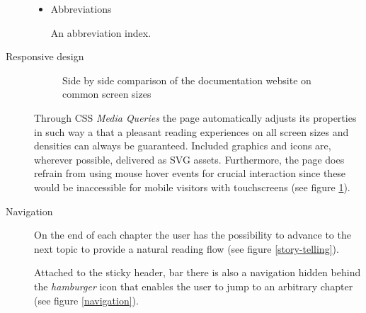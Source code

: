 \begin{description}
\begin{itemize}
		\item Abbreviations

		An abbreviation index.

	\end{itemize}

	\item[Responsive design]\hfill

	\begin{figure}[]
		\caption{Side by side comparison of the documentation website on common screen sizes}
		\label{responsive-design}
	\end{figure}

	Through \ac{CSS} \textit{Media Queries} the page automatically adjusts its properties in such way a that a pleasant reading experiences on all screen sizes and densities can always be guaranteed. Included graphics and icons are, wherever possible, delivered as \ac{SVG} assets. Furthermore, the page does refrain from using mouse hover events for crucial interaction since these would be inaccessible for mobile visitors with touchscreens (see figure \ref{responsive-design}).

	\item[Navigation]\hfill

	On the end of each chapter the user has the possibility to advance to the next topic to provide a natural reading flow (see figure \ref{story-telling}).

	Attached to the sticky header, bar there is also a navigation hidden behind the \textit{hamburger} icon that enables the user to jump to an arbitrary chapter (see figure \ref{navigation}).


\end{description}
